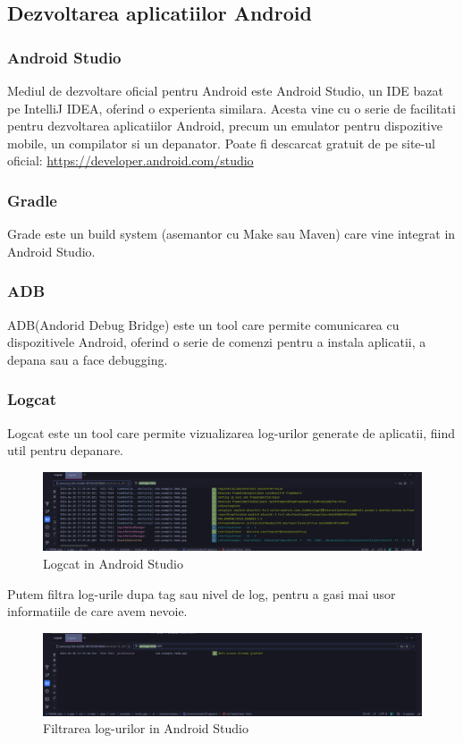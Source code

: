 \subsection{Dezvoltarea aplicatiilor Android}
\subsubsection{Android Studio}
Mediul de dezvoltare oficial pentru Android este Android Studio, un IDE bazat pe IntelliJ IDEA, oferind o experienta similara.
Acesta vine cu o serie de facilitati pentru dezvoltarea aplicatiilor Android, precum un emulator pentru dispozitive mobile, un compilator si un depanator.
Poate fi descarcat gratuit de pe site-ul oficial: \url{https://developer.android.com/studio}
\subsubsection{Gradle}
Grade este un build system (asemantor cu Make sau Maven) care vine integrat in Android Studio.
\subsubsection{ADB}
ADB(Andorid Debug Bridge) este un tool care permite comunicarea cu dispozitivele Android, oferind o serie de comenzi pentru a instala aplicatii, a depana sau a face debugging.
\subsubsection{Logcat}
Logcat este un tool care permite vizualizarea log-urilor generate de aplicatii, fiind util pentru depanare.
\begin{figure}[H]
    \centering
    \includegraphics[width=0.7\linewidth]{figs/logcat_all.png}
    \caption{Logcat in Android Studio}
    \label{fig:logcat}
\end{figure}
Putem filtra log-urile dupa tag sau nivel de log, pentru a gasi mai usor informatiile de care avem nevoie.
\begin{figure}[H]
    \centering
    \includegraphics[width=0.7\linewidth]{figs/logcat_wifi.png}
    \caption{Filtrarea log-urilor in Android Studio}
    \label{fig:logcat_filter}
\end{figure}